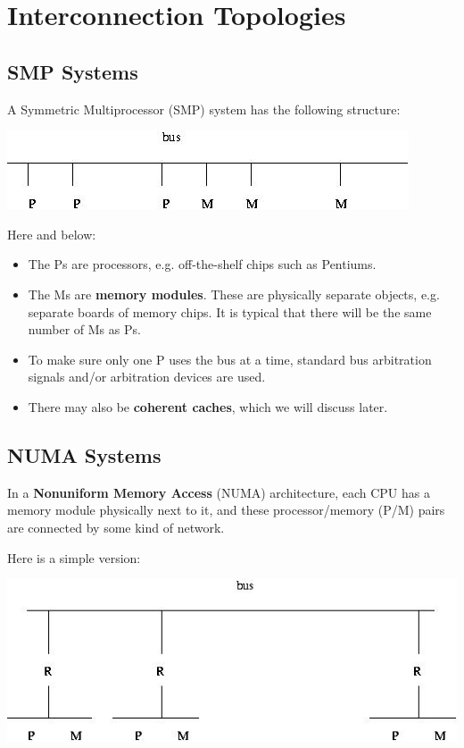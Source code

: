 \section{Interconnection Topologies}

\subsection{SMP Systems}

A Symmetric Multiprocessor (SMP) system has the following structure:

\includegraphics{Images/UMABus.jpg}

Here and below:

\begin{itemize}

\item The Ps are processors, e.g. off-the-shelf chips such as Pentiums.

\item The Ms are \textbf{memory modules}. These are physically separate
objects, e.g. separate boards of memory chips.  It is typical that there
will be the same number of Ms as Ps.

\item To make sure only one P uses the bus at a time, standard bus
arbitration signals and/or arbitration devices are used.

\item There may also be \textbf{coherent caches}, which we will discuss later.

\end{itemize}

\subsection{NUMA Systems}

In a {\bf Nonuniform Memory Access} (NUMA) architecture, each CPU has a
memory module physically next to it, and these processor/memory (P/M)
pairs are connected by some kind of network.

Here is a simple version:

\includegraphics{Images/NUMABus.jpg}

